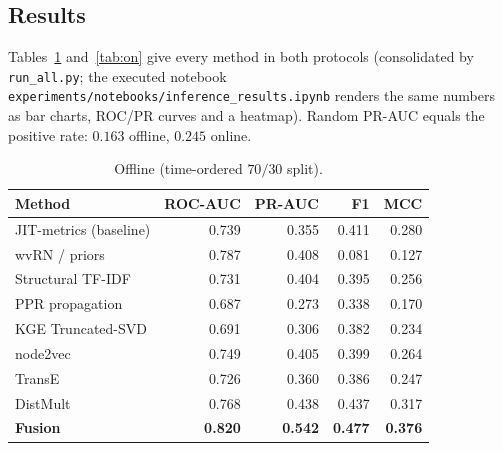 \documentclass[11pt,a4paper]{article}
\begin{document}
\subsection{Results}
Tables~\ref{tab:off} and~\ref{tab:on} give every method in both protocols
(consolidated by \texttt{run\_all.py}; the executed notebook
\texttt{experiments/notebooks/inference\_results.ipynb} renders the same numbers
as bar charts, ROC/PR curves and a heatmap). Random PR-AUC equals the positive
rate: $0.163$ offline, $0.245$ online.

\begin{table}[h]\centering\small
\caption{Offline (time-ordered $70/30$ split).}\label{tab:off}
\begin{tabular}{@{}lrrrr@{}}
\toprule
\textbf{Method} & \textbf{ROC-AUC} & \textbf{PR-AUC} & \textbf{F1} & \textbf{MCC}\\
\midrule
JIT-metrics (baseline) & 0.739 & 0.355 & 0.411 & 0.280\\
wvRN / priors          & 0.787 & 0.408 & 0.081 & 0.127\\
Structural TF-IDF      & 0.731 & 0.404 & 0.395 & 0.256\\
PPR propagation        & 0.687 & 0.273 & 0.338 & 0.170\\
KGE Truncated-SVD      & 0.691 & 0.306 & 0.382 & 0.234\\
node2vec               & 0.749 & 0.405 & 0.399 & 0.264\\
TransE                 & 0.726 & 0.360 & 0.386 & 0.247\\
DistMult               & 0.768 & 0.438 & 0.437 & 0.317\\
\textbf{Fusion}        & \textbf{0.820} & \textbf{0.542} & \textbf{0.477} & \textbf{0.376}\\
\bottomrule
\end{tabular}
\end{table}
\end{document}
